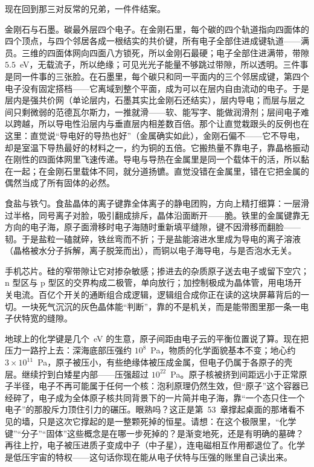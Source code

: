 
现在回到那三对反常的兄弟，一件件结案。

金刚石与石墨。碳最外层四个电子。在金刚石里，每个碳的四个轨道指向四面体的四个顶点，与四个邻居各成一根结实的共价键，所有电子全部住进成键轨道——满员。三维的四面体网向四面八方锁死，所以金刚石最硬；电子全部住进满带，带隙 \(5.5\)~eV，无载流子，所以绝缘；可见光光子能量不够跳过带隙，所以透明。三件事是同一件事的三张脸。在石墨里，每个碳只和同一平面内的三个邻居成键，第四个电子没有固定搭档——它离域到整个平面，成为可以在层内自由流动的电子。于是层内是强共价网（单论层内，石墨其实比金刚石还结实），层内导电；而层与层之间只剩微弱的范德瓦尔斯力，一推就滑——软、能写字、能做润滑剂；层间电子难以跨越，所以导电性沿层内与垂直层内相差数百倍。那个让直觉栽跟头的反例也在这里：直觉说“导电好的导热也好”（金属确实如此），金刚石偏不——它不导电，却是室温下导热最好的材料之一，约为铜的五倍。它搬热量不靠电子，靠晶格振动在刚性的四面体网里飞速传递。导电与导热在金属里是同一个载体干的活，所以黏在一起；在金刚石里载体不同，就分道扬镳。直觉没错在金属里，错在它把金属的偶然当成了所有固体的必然。

食盐与铁勺。食盐晶体的离子键靠全体离子的静电团购，方向上精打细算：一层滑过半格，同号离子对脸，吸引翻成排斥，晶体沿面断开——脆。铁里的金属键靠无方向的电子海，原子面滑移时电子海随时重新填平缝隙，键不因滑移而翻脸——韧。于是盐粒一磕就碎，铁丝弯而不折；于是盐能溶进水里成为导电的离子溶液（晶格被水分子拆解，离子脱笼而出），而铜以电子海导电，与是否泡水无关。

手机芯片。硅的窄带隙让它对掺杂敏感；掺进去的杂质原子送去电子或留下空穴；n 型区与 p 型区的交界构成二极管，单向放行；加控制极成为晶体管，用电场开关电流。百亿个开关的通断组合成逻辑，逻辑组合成你正在读的这块屏幕背后的一切。一块死气沉沉的灰色晶体能“判断”，靠的不是机关，而是能带图里那一条一电子伏特宽的缝隙。


\begin{thought}
地球上的化学键是几个~eV 的生意，原子间距由电子云的平衡位置说了算。现在把压力一路拧上去：深海底部压强约 \(10^{8}\)~Pa，物质的化学面貌基本不变；地心约 \(3\times10^{11}\)~Pa，原子被压小，有些绝缘体被压成金属，但电子仍属于各原子的壳层。继续拧到白矮星内部——压强超过 \(10^{22}\)~Pa。原子核被挤到间距远小于正常原子半径，电子不再可能属于任何一个核：泡利原理仍然生效，但“原子”这个容器已经碎了，电子成为全体原子核共同背景下的一片简并电子海，靠“一个态只住一个电子”的那股斥力顶住引力的碾压。眼熟吗？这正是第~53~章撑起桌面的那堵看不见的墙，只是这次它撑起的是一整颗死掉的恒星。请想：在这个极限里，“化学键”“分子”“固体”这些概念是在哪一步死掉的？是渐变地死，还是有明确的墓碑？再往上拧，电子被压进质子变成中子（中子星），连电磁相互作用都退位了。化学是低压宇宙的特权——这句话你现在能从电子伏特与压强的账里自己读出来。
\end{thought}

